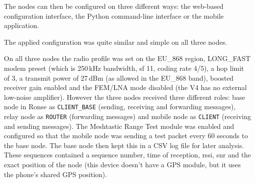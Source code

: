 The nodes can then be configured on three different ways: the web-based configuration interface, the Python command-line interface or the mobile application.

The applied configuration was quite similar and simple on all three nodes.

On all three nodes the radio profile was set on the EU\_868 region, LONG\_FAST modem preset (which is 250\,kHz bandwidth, \gls{sf} 11, coding rate 4/5), a hop limit of 3, a transmit power of 27\,dBm (as allowed in the EU\_868 band),
boosted receiver gain enabled and the FEM/LNA mode disabled (the V4 has no external low-noise amplifier).
However the three nodes received three different roles: base node in Ronse as \texttt{CLIENT\_BASE} (sending, receiving and forwarding messages), relay node as \texttt{ROUTER} (forwarding messages) and mobile node as \texttt{CLIENT} (receiving and sending messages). 
The Meshtastic Range Test module was enabled and configured so that the mobile node was sending a test packet every 60 seconds to the base node. The base node then kept this in a CSV log file for later analysis.
These sequences contained a sequence number, time of reception, \gls{rssi}, \gls{snr} and the exact position of the node (this device doesn't have a GPS module, but it uses the phone's shared GPS position).

